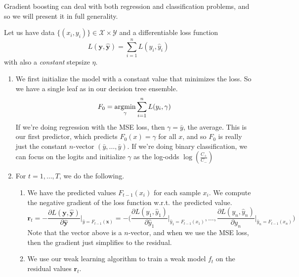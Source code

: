   Gradient boosting can deal with both regression and classification problems, and so we will present it in full generality. 

  \begin{definition}
    \label{def:gradient-boosting}
    Let us have data $\{(x_i, y_i)\} \in \mathcal{X} \times \mathcal{Y}$ and a differentiable loss function 
    \begin{equation}
      L(\mathbf{y}, \hat{\mathbf{y}}) = \sum_{i=1}^n L(y_i, \hat{y}_i)
    \end{equation}
    with also a \textit{constant} stepsize $\eta$. 

    \begin{enumerate}
      \item We first initialize the model with a constant value that minimizes the loss. So we have a single leaf as in our decision tree ensemble. 
        \begin{equation}
          F_0 = \operatorname*{\arg\!\min}_\gamma \sum_{i=1}^n L(y_i, \gamma)
        \end{equation}
        If we're doing regression with the MSE loss, then $\gamma = \bar{y}$, the average. This is our first predictor, which predicts $F_0 (x) = \gamma$ for all $x$, and so $F_0$ is really just the constant $n$-vector $(\bar{y}, \ldots, \bar{y})$. If we're doing binary classification, we can focus on the logits and initialize $\gamma$ as the log-odds $\log(\frac{C_+}{C_{-}})$

      \item For $t = 1, \ldots, T$, we do the following. 
        \begin{enumerate}
          \item We have the predicted values $F_{t-1}(x_i)$ for each sample $x_i$. We compute the negative gradient of the loss function w.r.t. the predicted value.
            \begin{equation}
              \mathbf{r}_t = - \frac{\partial L(\mathbf{y}, \hat{\mathbf{y}})}{\partial \hat{\mathbf{y}}} \bigg|_{\hat{y} = F_{t-1} (\mathbf{x})} = - \bigg( \frac{\partial L(y_1, \hat{y}_1)}{\partial \hat{y}_1} \bigg|_{\hat{y}_1 = F_{t-1} (x_1)}, \ldots, \frac{\partial L(y_n, \hat{y}_n)}{\partial y_n} \bigg|_{\hat{y}_n = F_{t-1}(x_n)} \bigg)
            \end{equation}
            Note that the vector above is a $n$-vector, and when we use the MSE loss, then the gradient just simplifies to the residual.  

          \item We use our weak learning algorithm to train a weak model $f_t$ on the residual values $\mathbf{r}_t$. 


\end{enumerate}
\end{enumerate}
\end{definition}
